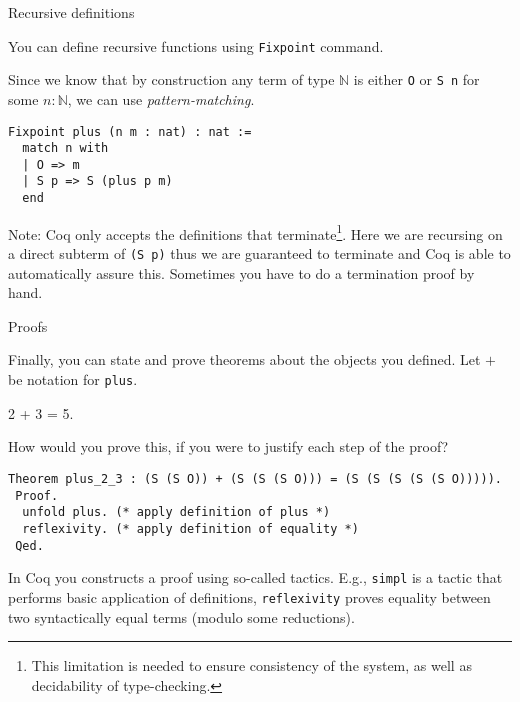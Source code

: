 \documentclass[10pt]{beamer}
\begin{document}
\begin{frame}[fragile]{Recursive definitions}

  You can define recursive functions using \texttt{Fixpoint} command.

  Since we know that by construction any term of type $\mathbb{N}$ is either \texttt{O} or \texttt{S n} for some $n : \mathbb{N}$, we can use {\it pattern-matching}.
  
   \begin{lstlisting}[language=Coq]
  Fixpoint plus (n m : nat) : nat :=
  match n with
  | O => m
  | S p => S (plus p m)
  end
   \end{lstlisting}
   
Note: Coq only accepts the definitions that terminate\footnote{This limitation is needed to ensure consistency of the system, as well as decidability of type-checking.}. Here we are recursing on a direct subterm of \texttt{(S p)} thus we are guaranteed to terminate and Coq is able to automatically assure this. Sometimes you have to do a termination proof by hand. 
\end{frame}


\begin{frame}[fragile]{Proofs}


  Finally, you can state and prove theorems about the objects you defined. Let $+$ be notation for \texttt{plus}.

  \begin{theorem} 2 + 3 = 5.
    \end{theorem}

  How would you prove this, if you were to justify each step of the proof?
  
  \begin{lstlisting}[language=Coq]
Theorem plus_2_3 : (S (S O)) + (S (S (S O))) = (S (S (S (S (S O))))).
 Proof.
  unfold plus. (* apply definition of plus *)
  reflexivity. (* apply definition of equality *)
 Qed.

  \end{lstlisting}
  In Coq you constructs a proof using so-called {\sf tactics}.
  E.g., \texttt{simpl} is a tactic that performs basic application of definitions, \texttt{reflexivity} proves equality between two syntactically equal terms (modulo some reductions).  
 
\end{frame}
\end{document}
